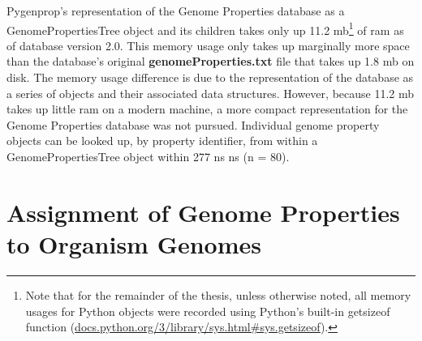 Pygenprop's representation of the Genome Properties database as a 
GenomePropertiesTree object and its children takes only up 11.2 
\gls{mb}\footnote{Note that for the remainder of the thesis, unless otherwise 
noted, all memory usages for Python objects were recorded using Python's 
built-in getsizeof function 
(\href{http://docs.python.org/3/library/sys.html\#sys.getsizeof}{docs.python.org/3/library/sys.html\#sys.getsizeof}).} 
of \gls{ram} as of database version 2.0. This memory usage only takes up 
marginally more space than the database's original \textbf{genomeProperties.txt} 
file that takes up 1.8 \gls{mb} on disk. The memory usage difference is due to 
the representation of the database as a series of objects and their associated 
data structures. However, because 11.2 \gls{mb} takes up little \gls{ram} on a 
modern machine, a more compact representation for the Genome Properties database 
was not pursued. Individual genome property objects can be looked up, by 
property identifier, from within a GenomePropertiesTree object within 277 ns 
 ns (\gls{n} = 80).

\section{Assignment of Genome Properties to Organism Genomes} \label{property-assign}

